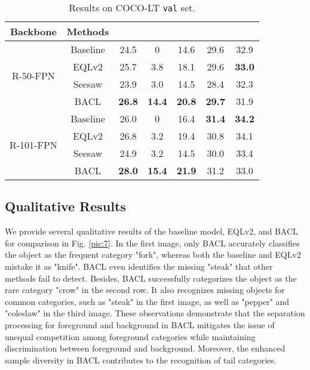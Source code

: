 \documentclass[lettersize,journal]{IEEEtran}
\begin{document}
\begin{table}[t]
    \centering
    \caption{Results on COCO-LT \texttt{val} set.}
    \begin{tabular}{c|c|c|cccc}
        \toprule
        Backbone                        & Methods &    &    &    &    &    \\ \midrule
        \multirow{4}{*}{R-50-FPN}  & Baseline    & 24.5 & 0 & 14.6 & 29.6 & 32.9  \\
                                        & EQLv2    & 25.7 & 3.8 & 18.1 & 29.6 & \textbf{33.0}  \\
                                        & Seesaw    & 23.9 & 3.0 & 14.5 & 28.4 & 32.3  \\
                                        & BACL    & \textbf{26.8} & \textbf{14.4} & \textbf{20.8} & \textbf{29.7} & 31.9  \\ \midrule
        \multirow{4}{*}{R-101-FPN} & Baseline    &   26.0    &    0   &   16.4    &    \textbf{31.4}   &  \textbf{34.2}     \\
                                        & EQLv2    & 26.8 & 3.2 & 19.4 & 30.8 & 34.1  \\
                                        & Seesaw    & 24.9 & 3.2 & 14.5 & 30.0 & 33.4  \\
                                        & BACL    & \textbf{28.0} & \textbf{15.4} & \textbf{21.9} & 31.2 & 33.0  \\ \bottomrule
        \end{tabular}
    \label{tab:cocolt}
    \vspace{-3mm}
\end{table}

\subsection{Qualitative Results}
We provide several qualitative results of the baseline model, EQLv2, and BACL for comparison in Fig. \ref{pic:7}.
In the first image, only BACL accurately classifies the object as the frequent category "fork", whereas both the baseline and EQLv2 mistake it as "knife".
BACL even identifies the missing "steak" that other methods fail to detect.
Besides, BACL successfully categorizes the object as the rare category "crow" in the second row.
It also recognizes missing objects for common categories, such as "steak" in the first image, as well as "pepper" and "coleslaw" in the third image.
These observations demonstrate that the separation processing for foreground and background in BACL mitigates the issue of unequal competition among foreground categories while maintaining discrimination between foreground and background.
Moreover, the enhanced sample diversity in BACL contributes to the recognition of tail categories.
\end{document}
